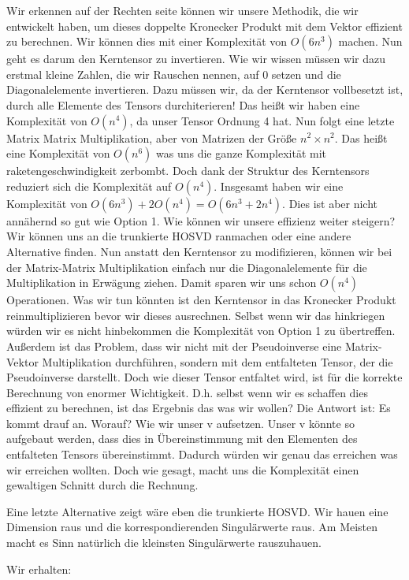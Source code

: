Wir erkennen auf der Rechten seite können wir unsere Methodik, die wir entwickelt haben, um dieses doppelte Kronecker Produkt mit dem Vektor effizient zu berechnen. 
Wir können dies mit einer Komplexität von $O(6n^3)$ machen. Nun geht es darum den Kerntensor zu invertieren. Wie wir wissen müssen wir dazu erstmal kleine Zahlen, die wir Rauschen nennen, auf 0 setzen und die Diagonalelemente invertieren. Dazu müssen wir, da der Kerntensor vollbesetzt ist, durch alle Elemente des Tensors durchiterieren! Das heißt wir haben eine Komplexität von $O(n^4)$, da unser Tensor Ordnung 4 hat. Nun folgt eine letzte Matrix Matrix Multiplikation, aber von Matrizen der Größe $n^2 \times n^2$. Das heißt eine Komplexität von $O(n^6)$ was uns die ganze Komplexität mit raketengeschwindigkeit zerbombt. Doch dank der Struktur des Kerntensors reduziert sich die Komplexität auf $O(n^4)$. 
Insgesamt haben wir eine Komplexität von $O(6n^3)+2O(n^4)=O(6n^3+2n^4)$. Dies ist aber nicht annähernd so gut wie Option 1. Wie können wir unsere effizienz weiter steigern?
Wir können uns an die trunkierte HOSVD ranmachen oder eine andere Alternative finden.
Nun anstatt den Kerntensor zu modifizieren, können wir bei der Matrix-Matrix Multiplikation einfach nur die Diagonalelemente für die Multiplikation in Erwägung ziehen. Damit sparen wir uns schon $O(n^4)$ Operationen. Was wir tun könnten ist den Kerntensor in das Kronecker Produkt reinmultiplizieren bevor wir dieses ausrechnen. Selbst wenn wir das hinkriegen würden wir es nicht hinbekommen die Komplexität von Option 1 zu übertreffen. Außerdem ist das Problem, dass wir nicht mit der Pseudoinverse eine Matrix-Vektor Multiplikation durchführen, sondern mit dem entfalteten Tensor, der die Pseudoinverse darstellt. Doch wie dieser Tensor entfaltet wird, ist für die korrekte Berechnung von enormer Wichtigkeit.
D.h. selbst wenn wir es schaffen dies effizient zu berechnen, ist das Ergebnis das was wir wollen?
Die Antwort ist: Es kommt drauf an. Worauf? Wie wir unser v aufsetzen. Unser v könnte so aufgebaut werden, dass dies in Übereinstimmung mit den Elementen des entfalteten Tensors übereinstimmt. Dadurch würden wir genau das erreichen was wir erreichen wollten. Doch wie gesagt, macht uns die Komplexität einen gewaltigen Schnitt durch die Rechnung.

Eine letzte Alternative zeigt wäre eben die trunkierte HOSVD.
Wir hauen eine Dimension raus und die korrespondierenden Singulärwerte raus. Am Meisten macht es Sinn natürlich die kleinsten Singulärwerte rauszuhauen. 

Wir erhalten:

